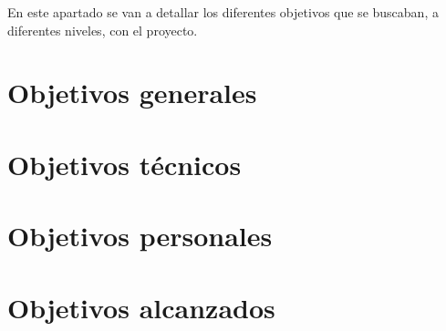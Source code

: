 
En este apartado se van a detallar los diferentes objetivos que se buscaban, a diferentes niveles, con el proyecto.

\section{Objetivos generales}\label{objetivos-generales}


\section{Objetivos técnicos}\label{objetivos-tecnicos}


\section{Objetivos personales}\label{objetivos-personales}


\section{Objetivos alcanzados}\label{objetivos-alcanzados}